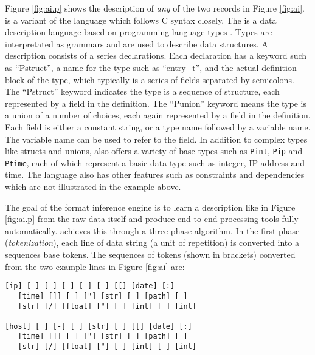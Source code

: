 Figure \ref{fig:ai.p} shows the \padsc {} description of {\em any}
of the two records in Figure \ref{fig:ai}. \padsc{} is a variant of the
\pads{} language which follows C syntax closely. 
The \pads{} is a data description language based on programming language types 
\cite{sigcomm00,gpce02}. 
Types are interpretated as grammars and are used to describe data structures.
A \padsc{} description consists of a series declarations. Each declaration
has a keyword such as ``Pstruct'', a name for the type such as ``entry\_t'',
and the actual definition block of the type, which typically is a series of
fields separated by semicolons. The ``Pstruct'' keyword indicates the type
is a sequence of structure, each represented by a field in the definition.
The ``Punion'' keyword means the type is a union of a number of choices,
each again represented by a field in the definition. Each field is either
a constant string, or a type name followed by a variable name. The variable
name can be used to refer to the field. In addition to complex types
like structs and unions, \padsc{} also 
offers a variety of base types such as {\tt Pint}, {\tt Pip} and {\tt Ptime},
each of which represent a basic data type such as integer, IP address and
time. The \pads{} language also has other features
such as constraints and dependencies which are not illustrated in the example
above. 


The goal of the \learnpads{} format inference engine is to 
learn a \pads{} description like in Figure \ref{fig:ai.p} from
the raw data itself and produce end-to-end processing tools fully
automatically. \learnpads{} achieves this through a three-phase algorithm.
In the first phase ({\em tokenization}), each line of data string (a unit of
repetition) is converted into a sequences base tokens. The sequences of
tokens (shown in brackets) converted from the two example lines 
in Figure \ref{fig:ai} are:

{\small
\begin{verbatim}
[ip] [ ] [-] [ ] [-] [ ] [[] [date] [:] 
   [time] []] [ ] ["] [str] [ ] [path] [ ] 
   [str] [/] [float] ["] [ ] [int] [ ] [int]

[host] [ ] [-] [ ] [str] [ ] [[] [date] [:] 
   [time] []] [ ] ["] [str] [ ] [path] [ ] 
   [str] [/] [float] ["] [ ] [int] [ ] [int]
\end{verbatim}
}

